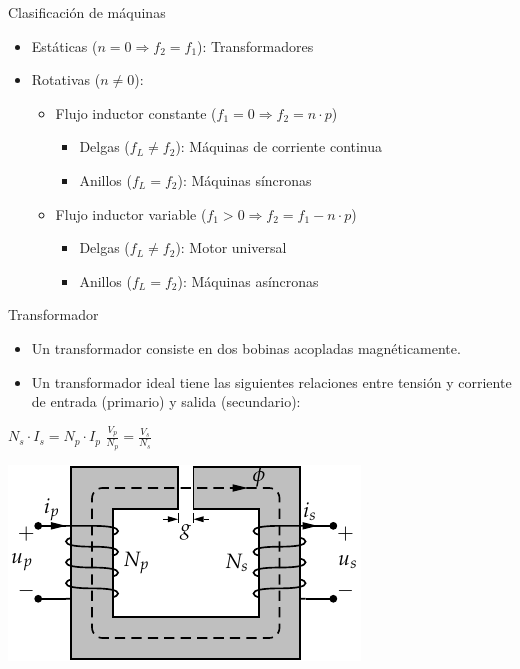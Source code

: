 \documentclass[xcolor={usenames,svgnames,dvipsnames}]{beamer}
\begin{document}
\begin{frame}[label={sec:orgf8e8344}]{Clasificación de máquinas}
\begin{itemize}
\item Estáticas (\(n=0\Rightarrow f_{2}=f_{1}\)): Transformadores

\item Rotativas (\(n\neq0\)):

\begin{itemize}
\item Flujo inductor constante (\(f_{1}=0\Rightarrow f_{2}=n\cdot
            p\))

\begin{itemize}
\item Delgas (\(f_{L}\neq f_{2}\)): Máquinas de corriente continua

\item Anillos (\(f_{L}=f_{2}\)): Máquinas síncronas
\end{itemize}

\item Flujo inductor variable (\(f_{1}>0\Rightarrow
            f_{2}=f_{1}-n\cdot p\))

\begin{itemize}
\item Delgas (\(f_{L}\neq f_{2}\)): Motor universal

\item Anillos (\(f_{L}=f_{2}\)): Máquinas asíncronas
\end{itemize}
\end{itemize}
\end{itemize}
\end{frame}

\begin{frame}[label={sec:org6d56947}]{Transformador}
\begin{itemize}
\item Un transformador consiste en dos bobinas acopladas magnéticamente.

\item Un transformador ideal tiene las siguientes relaciones entre tensión
y corriente de entrada (primario) y salida (secundario):
\end{itemize}

\(N_{s}\cdot I_{s}=N_{p}\cdot I_{p}\)
\(\frac{V_{p}}{N_{p}}=\frac{V_{s}}{N_{s}}\)

\begin{center}
\includegraphics[height=0.3\textheight]{../figs/Transformador2.pdf}
\end{center}
\end{frame}
\end{document}
